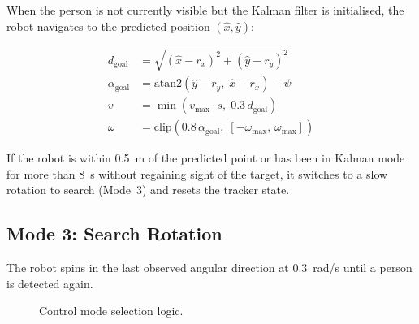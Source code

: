 \documentclass[12pt,a4paper]{article}
\begin{document}
When the person is not currently visible but the Kalman filter is initialised,
the robot navigates to the predicted position $(\hat{x}, \hat{y})$:

\begin{align}
  d_\text{goal}    &= \sqrt{(\hat{x}-r_x)^2 + (\hat{y}-r_y)^2} \\
  \alpha_\text{goal} &= \text{atan2}(\hat{y}-r_y,\;\hat{x}-r_x) - \psi \\
  v   &= \min(v_\text{max}\cdot s,\; 0.3\,d_\text{goal}) \\
  \omega &= \text{clip}(0.8\,\alpha_\text{goal},\; [-\omega_\text{max},\,\omega_\text{max}])
\end{align}

If the robot is within 0.5~m of the predicted point or has been in Kalman
mode for more than 8~s without regaining sight of the target, it switches to
a slow rotation to search (Mode~3) and resets the tracker state.

\subsection{Mode 3: Search Rotation}

The robot spins in the last observed angular direction at 0.3~rad/s until a
person is detected again.

\begin{figure}[htbp]
\centering
{}
\caption{Control mode selection logic.}
\end{figure}
\end{document}
